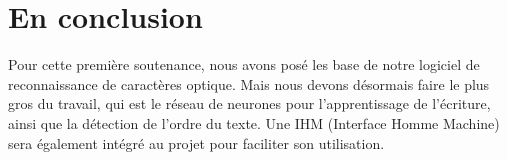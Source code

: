 \documentclass [french,12pt]{article}
\begin{document}
\section{En conclusion}

Pour cette première soutenance, nous avons posé les base de notre logiciel de reconnaissance de caractères optique. Mais nous devons désormais faire le plus gros du travail, qui est le réseau de neurones pour l’apprentissage de l’écriture, ainsi que la détection de l’ordre du texte. Une IHM (Interface Homme Machine) sera également intégré au projet pour faciliter son utilisation.
\end{document}
